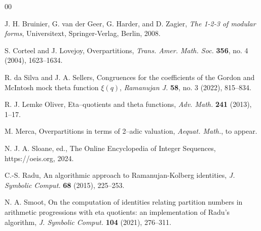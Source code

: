 \documentclass{amsart}
\begin{document}
\begin{thebibliography}{00}

J. H. Bruinier, G. van der Geer, G. Harder, and D. Zagier, {\it The 1-2-3 of modular forms}, Universitext, Springer-Verlag, Berlin, 2008. 

S. Corteel and J. Lovejoy, Overpartitions, {\it Trans. Amer. Math. Soc.} {\bf 356}, no. 4 (2004), 1623--1634.  

R. da Silva and J. A. Sellers, Congruences for the coefficients of the Gordon and McIntosh mock theta function $\xi(q)$,  {\it Ramanujan J.} {\bf 58}, no. 3 (2022), 815--834.

R. J. Lemke Oliver, Eta--quotients and theta functions, {\it Adv. Math.} {\bf 241} (2013), 1--17.

M. Merca,  Overpartitions in terms of 2--adic valuation, {\it Aequat. Math.}, to appear. 

N. J. A. Sloane, ed., The Online Encyclopedia of Integer Sequences, https://oeis.org, 2024.

C.-S. Radu, An algorithmic approach to Ramanujan-Kolberg identities, {\it J. Symbolic Comput.} {\bf 68} (2015), 225--253.

N. A. Smoot, On the computation of identities relating partition numbers in arithmetic progressions with eta quotients: an implementation of Radu's algorithm, 
{\it J. Symbolic Comput.} {\bf 104} (2021), 276--311.


\end{thebibliography}
\end{document}
